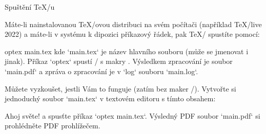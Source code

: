 {%


%

}

\sec Spuštění \TeX/u


Máte-li nainstalovanou \TeX/ovou distribuci na svém počítači (například \TeX/live
2022) %
a máte-li v systému k dipozici příkazový řádek, pak \TeX/ spustíte pomocí:

\begtt
optex main.tex
\endtt
kde `main.tex` je název hlavního souboru (může se jmenovat i jinak). 
Příkaz `optex` spustí \LuaTeX/ s makry \OpTeX. Výsledkem zpracování je soubor 
`main.pdf` a zpráva o zpracování je v `log` souboru `main.log`.

Můžete vyzkoušet, jestli Vám to funguje (zatím bez maker \OpBible/). Vytvořte si jednoduchý soubor `main.tex` v textovém editoru s tímto obsahem:

\begtt
\fontfam[lm]
Ahoj světe!
\bye
\endtt
a spusťte příkaz `optex main.tex`. Výsledný PDF soubor `main.pdf` si prohlédněte PDF prohlížečem.

